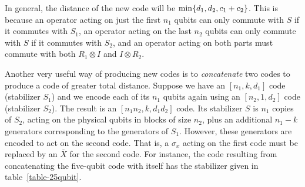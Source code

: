 \documentclass{report}
\newcommand{\X}{\sigma_x}
\newcommand{\Xbar}{\overline{X}}
\begin{document}
In general, the distance of the new code will be ${\rm min}\{d_1, d_2, c_1 
+ c_2 \}$.  This is because an operator acting on just the first $n_1$ qubits 
can only commute with $S$ if it commutes with $S_1$, an operator acting 
on the last $n_2$ qubits can only commute with $S$ if it commutes with 
$S_2$, and an operator acting on both parts must commute with both $R_1 
\otimes I$ and $I \otimes R_2$.

Another very useful way of producing new codes is to {\em concatenate} 
two codes to produce a code of greater total distance.  Suppose we have an 
$[n_1, k, d_1]$ code (stabilizer $S_1$) and we encode each of its $n_1$ 
qubits again using an $[n_2, 1, d_2]$ code (stabilizer $S_2$).  The result is 
an $[n_1 n_2, k, d_1 d_2]$ code.  Its stabilizer $S$ is $n_1$ copies of $S_2$, 
acting on the physical qubits in blocks of size $n_2$, plus an additional 
$n_1 - k$ generators corresponding to the generators of $S_1$.  However, these 
generators are encoded to act on the second code.  That is, a $\X$ acting 
on the first code must be replaced by an $\Xbar$ for the second code.  For 
instance, the code resulting from concatenating the five-qubit code with itself 
has the stabilizer given in table~\ref{table-25qubit}.
\end{document}
